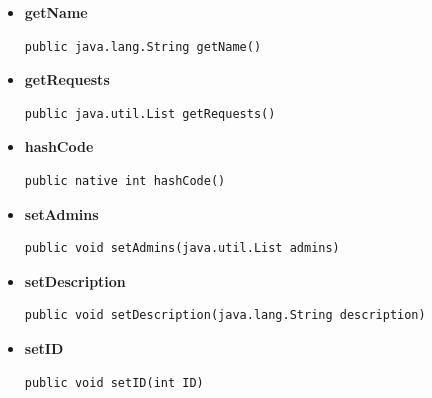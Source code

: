 \documentclass[11pt,a4paper]{article}
\begin{document}
{{{{{\begin{itemize}
{\begin{lstlisting}[frame=none]
public java.util.List getMembers()\end{lstlisting} %
}%
\item{ 
\hypertarget{edu.kit.pse17.go_app.PersistenceLayer.GroupEntity.getName()}{{\bf  getName}\\}
\begin{lstlisting}[frame=none]
public java.lang.String getName()\end{lstlisting} %
}%
\item{ 
\hypertarget{edu.kit.pse17.go_app.PersistenceLayer.GroupEntity.getRequests()}{{\bf  getRequests}\\}
\begin{lstlisting}[frame=none]
public java.util.List getRequests()\end{lstlisting} %
}%
\item{ 
\hypertarget{edu.kit.pse17.go_app.PersistenceLayer.GroupEntity.hashCode()}{{\bf  hashCode}\\}
\begin{lstlisting}[frame=none]
public native int hashCode()\end{lstlisting} %
}%
\item{ 
\hypertarget{edu.kit.pse17.go_app.PersistenceLayer.GroupEntity.setAdmins(java.util.List)}{{\bf  setAdmins}\\}
\begin{lstlisting}[frame=none]
public void setAdmins(java.util.List admins)\end{lstlisting} %
}%
\item{ 
\hypertarget{edu.kit.pse17.go_app.PersistenceLayer.GroupEntity.setDescription(java.lang.String)}{{\bf  setDescription}\\}
\begin{lstlisting}[frame=none]
public void setDescription(java.lang.String description)\end{lstlisting} %
}%
\item{ 
\hypertarget{edu.kit.pse17.go_app.PersistenceLayer.GroupEntity.setID(int)}{{\bf  setID}\\}
\begin{lstlisting}[frame=none]
public void setID(int ID)\end{lstlisting} %
}%

\end{itemize}}}}}}
\end{document}
